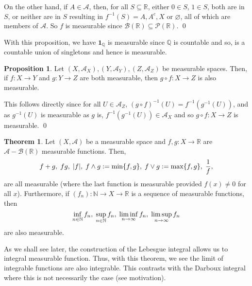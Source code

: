 \documentclass[
]{article}
\theoremstyle{definition}
\newtheorem{theorem}{Theorem}
\newtheorem{prop}{Proposition}
\theoremstyle{definition}
\begin{document}
On the other hand, if \(A \in \mathcal{A}\), then, for all
\(S \subseteq \mathbb{R}\), either \(0 \in S\), \(1 \in S\), both are in
\(S\), or neither are in \(S\) resulting in \(f^{-1}(S) = A, A^c, X\) or
\(\varnothing\), all of which are members of \(\mathcal{A}\). So \(f\)
is measurable since
\(\mathcal{B}(\mathbb{R}) \subseteq \mathcal{P}(\mathbb{R})\). \qed

With this proposition, we have \(\mathbf{1}_\mathbb{Q}\) is measurable
since \(\mathbb{Q}\) is countable and so, is a countable union of
singletons and hence is measurable.

\begin{prop}
  Let \((X, \mathcal{A}_X), (Y, \mathcal{A}_Y), (Z, \mathcal{A}_Z)\) be measurable 
  spaces. Then, if \(f : X \to Y\) and \(g : Y \to Z\) are both measurable, 
  then \(g \circ f : X \to Z\) is also measurable.
\end{prop}
\proof

This follows directly since for all \(U \in \mathcal{A}_Z\),
\((g \circ f)^{-1}(U) = f^{-1}(g^{-1}(U))\), and as \(g^{-1}(U)\) is
measurable as \(g\) is, \(f^{-1}(g^{-1}(U)) \in \mathcal{A}_X\) and so
\(g \circ f : X \to Z\) is measurable. \qed

\begin{theorem}
  Let \((X, \mathcal{A})\) be a measurable space and \(f, g : X \to \mathbb{R}\) 
  are \(\mathcal{A} - \mathcal{B}(\mathbb{R})\) measurable functions. Then, 
  \[f + g, \hspace{1mm} fg, \hspace{1mm} |f|, \hspace{1mm} f \wedge g := \min\{f, g\}, 
    \hspace{1mm} f \vee g := \max\{f, g\}, \hspace{1mm} \frac{1}{f},\]
  are all measurable (where the last function is measurable provided \(f(x) \neq 0\) 
  for all \(x\)). Furthermore, if \((f_n) : \mathbb{N} \to X \to \mathbb{R}\) 
  is a sequence of measurable functions, then 
  \[\inf_{n \in \mathbb{N}} f_n, \hspace{1mm} \sup_{n \in \mathbb{N}} f_n, 
    \hspace{1mm} \liminf_{n \to \infty} f_n, \hspace{1mm} \limsup_{n \to \infty} f_n\]
  are also measurable. 
\end{theorem}

As we shall see later, the construction of the Lebesgue integral allows
us to integral measurable function. Thus, with this theorem, we see the
limit of integrable functions are also integrable. This contrasts with
the Darboux integral where this is not necessarily the case (see
motivation).
\end{document}
